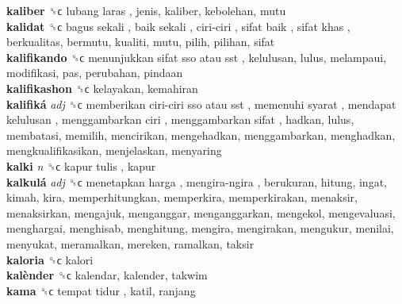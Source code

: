 \textbf{kaliber} ␝ϲ   lubang laras , jenis, kaliber, kebolehan, mutu  \\
\textbf{kalidat} ␝ϲ   bagus sekali ,  baik sekali ,  ciri-ciri ,  sifat baik ,  sifat khas , berkualitas, bermutu, kualiti, mutu, pilih, pilihan, sifat  \\
\textbf{kalifikando} ␝ϲ   menunjukkan sifat sso atau sst , kelulusan, lulus, melampaui, modifikasi, pas, perubahan, pindaan  \\
\textbf{kalifikashon} ␝ϲ  kelayakan, kemahiran  \\
\textbf{kalifiká} \emph{adj}  ␝ϲ   memberikan ciri-ciri sso atau sst ,  memenuhi syarat ,  mendapat kelulusan ,  menggambarkan ciri ,  menggambarkan sifat , hadkan, lulus, membatasi, memilih, mencirikan, mengehadkan, menggambarkan, menghadkan, mengkualifikasikan, menjelaskan, menyaring  \\
\textbf{kalki} \emph{n}  ␝ϲ   kapur tulis , kapur  \\
\textbf{kalkulá} \emph{adj}  ␝ϲ   menetapkan harga ,  mengira-ngira , berukuran, hitung, ingat, kimah, kira, memperhitungkan, memperkira, memperkirakan, menaksir, menaksirkan, mengajuk, menganggar, menganggarkan, mengekol, mengevaluasi, menghargai, menghisab, menghitung, mengira, mengirakan, mengukur, menilai, menyukat, meramalkan, mereken, ramalkan, taksir  \\
\textbf{kaloria} ␝ϲ  kalori  \\
\textbf{kalènder} ␝ϲ  kalendar, kalender, takwim  \\
\textbf{kama} ␝ϲ   tempat tidur , katil, ranjang  \\
